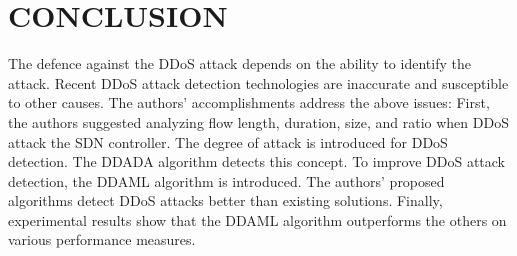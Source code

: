 \documentclass[12pt]{report}
\begin{document}
\section{CONCLUSION}
The defence against the DDoS attack depends on the ability to identify the attack. Recent DDoS attack detection technologies are inaccurate and susceptible to other causes. The authors’ accomplishments address the above issues: First, the authors suggested analyzing flow length, duration, size, and ratio when DDoS attack the SDN controller. The degree of attack is introduced for DDoS detection. The DDADA algorithm detects this concept. To improve DDoS attack detection, the DDAML algorithm is introduced. The authors' proposed algorithms detect DDoS attacks better than existing solutions. Finally, experimental results show that the DDAML algorithm outperforms the others on various performance measures.






 
{}
\end{document}
